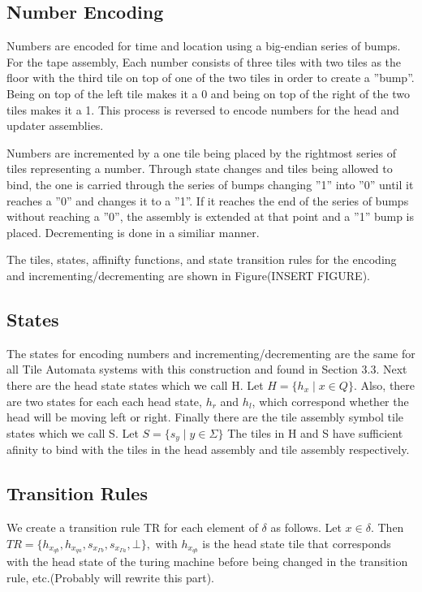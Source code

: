 \documentclass{article}
\begin{document}
\subsection{Number Encoding}
Numbers are encoded for time and location using a big-endian series of bumps.  For the tape assembly, Each number consists of three tiles with two tiles as the floor with the third tile on top of
one of the two tiles in order to create a ''bump''.  Being on top of the left tile makes it a 0
and being on top of the right of the two tiles makes it a 1.  This process is reversed to encode
numbers for the head and updater assemblies.

Numbers are incremented by a one tile being placed by the rightmost series of tiles representing a
number.  Through state changes and tiles being allowed to bind, the one is carried through the
series of bumps changing ''1'' into ''0'' until it reaches a ''0'' and changes it to a ''1''.  If
it reaches the end of the series of bumps without reaching a ''0'', the assembly is extended at
that point and a ''1'' bump is placed.  Decrementing is done in a similiar manner.


The tiles, states, affinifty functions, and state transition rules for the encoding and
incrementing/decrementing are shown in Figure(INSERT FIGURE).
\subsection{States}
The states for encoding numbers and incrementing/decrementing are the same for all Tile Automata
systems with this construction and found in Section 3.3.  Next there are the head state states
which we call H.  Let $H = \{h_x \mid x \in Q\}$.  Also, there are two states for each each head
state, $h_r $ and $h_l$, which correspond whether the head will be moving left or right.
Finally there are the tile assembly symbol tile states which we
call S.  Let $S = \{s_y \mid y \in \Sigma\}$  The tiles in H and S have sufficient afinity to bind
with the tiles in the head assembly and tile assembly respectively.  

\subsection{Transition Rules}
We create a transition rule TR for each element of $\delta$ as follows.  Let $x \in \delta$.  Then
$TR = \{h_{x_{qb}}, h_{x_{qa}}, s_{x_{\Gamma b}}, s_{x_{\Gamma a}}, \bot \},$ with $h_{x_{qb}}$ is the head state
  tile that corresponds with the head state of the turing machine before being changed in the
  transition rule, etc.(Probably will rewrite this part).
\end{document}
